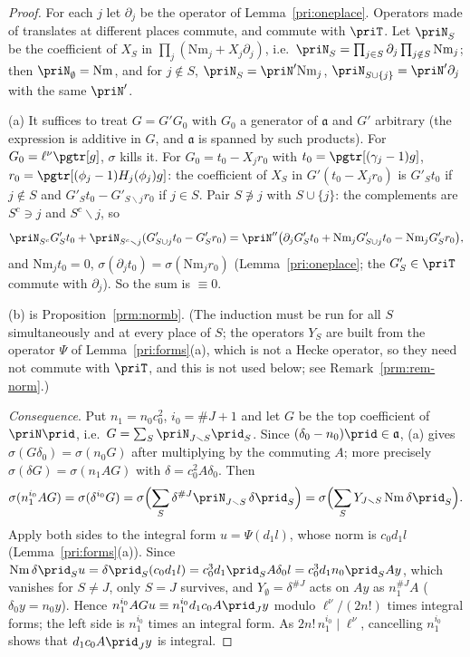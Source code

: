 \documentclass[10pt]{amsart}
\theoremstyle{definition}
\theoremstyle{remark}
\begin{document}
\begin{proof}
For each $j$ let $\partial_j$ be the operator of Lemma~\ref{pri:oneplace}. Operators made of
translates at different places commute, and commute with $\priT$. Let $\priN_S$ be the coefficient of
$X_S$ in $\prod_j(\mathrm{Nm}_j+X_j\partial_j)$, i.e.\ $\priN_S=\prod_{j\in S}\partial_j\prod_{j\notin
S}\mathrm{Nm}_j$; then $\priN_\emptyset=\mathrm{Nm}$, and for $j\notin S$, $\priN_S=\priN'\mathrm{Nm}_j$,
$\priN_{S\cup\{j\}}=\priN'\partial_j$ with the same $\priN'$.

(a) It suffices to treat $G=G'G_0$ with $G_0$ a generator of $\mathfrak a$ and $G'$ arbitrary
(the expression is additive in $G$, and $\mathfrak a$ is spanned by such products). For $G_0=
\ell^\nu\pgtr[g]$, $\sigma$ kills it. For $G_0=t_0-X_jr_0$ with $t_0=\pgtr[(\gamma_j-1)g]$, $r_0=
\pgtr[(\phi_j-1)H_j(\phi_j)g]$: the coefficient of $X_S$ in $G'(t_0-X_jr_0)$ is $G'_St_0$ if $j\notin S$
and $G'_{S}t_0-G'_{S\smallsetminus j}r_0$ if $j\in S$. Pair $S\not\ni j$ with $S\cup\{j\}$: the
complements are $S^c\ni j$ and $S^c\smallsetminus j$, so
\[
\priN_{S^c}G'_St_0+\priN_{S^c\smallsetminus j}(G'_{S\cup j}t_0-G'_Sr_0)=\priN''\bigl(\partial_j
G'_St_0+\mathrm{Nm}_jG'_{S\cup j}t_0-\mathrm{Nm}_jG'_Sr_0\bigr),
\]
and $\mathrm{Nm}_jt_0=0$, $\sigma(\partial_jt_0)=\sigma(\mathrm{Nm}_jr_0)$ (Lemma~\ref{pri:oneplace};
the $G'_S\in\priT$ commute with $\partial_j$). So the sum is $\equiv0$.

(b) is Proposition~\ref{prm:normb}. (The induction must be run for all $S$ simultaneously and at
every place of $S$; the operators $Y_S$ are built from the operator $\Psi$ of
Lemma~\ref{pri:forms}(a), which is not a Hecke operator, so they need not commute with $\priT$, and
this is not used below; see Remark~\ref{prm:rem-norm}.)

\emph{Consequence}. Put $n_1=n_0c_0^2$,
$i_0=\#J+1$ and let $G$ be the top coefficient of $\priN\prid$, i.e.\ $G=\sum_S\priN_{J\smallsetminus
S}\prid_S$. Since $(\delta_0-n_0)\prid\in\mathfrak a$, (a) gives $\sigma(G\delta_0)=\sigma(n_0G)$
after multiplying by the commuting $A$; more precisely $\sigma(\delta G)=\sigma(n_1AG)$ with
$\delta=c_0^2A\delta_0$. Then
\[
\sigma(n_1^{i_0}A G)=\sigma(\delta^{i_0}G)=\sigma\Bigl(\sum_S\delta^{\#J}\priN_{J\smallsetminus
S}\,\delta\prid_S\Bigr)=\sigma\Bigl(\sum_SY_{J\smallsetminus S}\,\mathrm{Nm}\,\delta\prid_S\Bigr).
\]
Apply both sides to the integral form $u=\Psi(d_1l)$, whose norm is $c_0d_1l$
(Lemma~\ref{pri:forms}(a)). Since $\mathrm{Nm}\,\delta\prid_S u=\delta\prid_S(c_0d_1l)=c_0^3d_1
\prid_SA\delta_0l=c_0^3d_1n_0\prid_SAy$, which vanishes for $S\ne J$, only $S=J$ survives, and
$Y_\emptyset=\delta^{\#J}$ acts on $Ay$ as $n_1^{\#J}A$ ($\delta_0y=n_0y$). Hence
$n_1^{i_0}AGu\equiv n_1^{i_0}d_1c_0A\prid_Jy$ modulo $\ell^\nu/(2n!)$ times integral forms; the left
side is $n_1^{i_0}$ times an integral form. As $2n!\,n_1^{i_0}\mid\ell^\nu$, cancelling $n_1^{i_0}$
shows that $d_1c_0A\prid_Jy$ is integral.
\end{proof}
\end{document}
